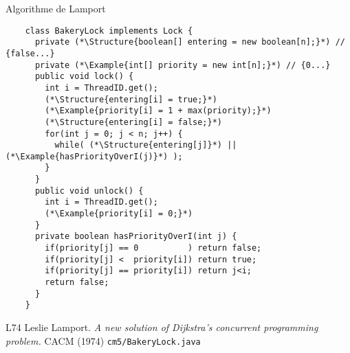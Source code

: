 
\begingroup

\begin{frame}[fragile]{Algorithme de Lamport}

  \begin{lstlisting}
    class BakeryLock implements Lock {
      private (*\Structure{boolean[] entering = new boolean[n];}*) // {false...}
      private (*\Example{int[] priority = new int[n];}*) // {0...}
      public void lock() {
        int i = ThreadID.get();
        (*\Structure{entering[i] = true;}*)
        (*\Example{priority[i] = 1 + max(priority);}*)
        (*\Structure{entering[i] = false;}*)
        for(int j = 0; j < n; j++) {
          while( (*\Structure{entering[j]}*) || (*\Example{hasPriorityOverI(j)}*) );
        }
      }
      public void unlock() {
        int i = ThreadID.get();
        (*\Example{priority[i] = 0;}*)
      }
      private boolean hasPriorityOverI(int j) {
        if(priority[j] == 0          ) return false;
        if(priority[j] <  priority[i]) return true;
        if(priority[j] == priority[i]) return j<i;
        return false;
      }
    }
  \end{lstlisting}

  \begin{citing}
  \item[L74] Leslie Lamport. \textit{A new solution of Dijkstra's concurrent programming problem.} CACM (1974)
    \jitem \lstinline{cm5/BakeryLock.java}
  \end{citing}

\end{frame}

\endgroup
\endinput
